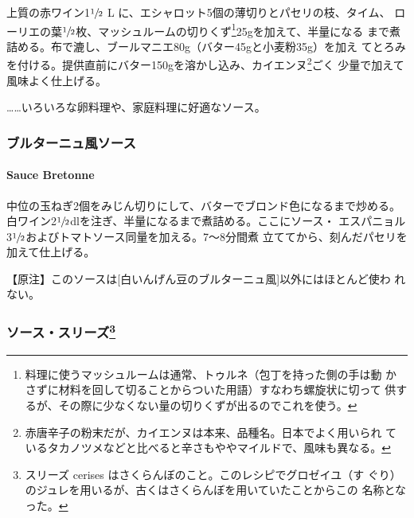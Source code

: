 
上質の赤ワイン1\(\sfrac{1}{2}\) L
に、エシャロット5個の薄切りとパセリの枝、タイム、
ローリエの葉\(\sfrac{1}{2}\)枚、マッシュルームの切りくず\footnote{料理に使うマッシュルームは通常、トゥルネ（包丁を持った側の手は動
  かさずに材料を回して切ることからついた用語）すなわち螺旋状に切って
  供するが、その際に少なくない量の切りくずが出るのでこれを使う。}25gを加えて、半量になる
まで煮詰める。布で漉し、ブールマニエ80g（バター45gと小麦粉35g）を加え
てとろみを付ける。提供直前にバター150gを溶かし込み、カイエンヌ\footnote{赤唐辛子の粉末だが、カイエンヌは本来、品種名。日本でよく用いられ
  ているタカノツメなどと比べると辛さもややマイルドで、風味も異なる。}ごく
少量で加えて風味よく仕上げる。

\ldots{}\ldots{}いろいろな卵料理や、家庭料理に好適なソース。

\maeaki

\hypertarget{ux30d6ux30ebux30bfux30fcux30cbux30e5ux98a8ux30bdux30fcux30b9}{%
\subsubsection{ブルターニュ風ソース}\label{ux30d6ux30ebux30bfux30fcux30cbux30e5ux98a8ux30bdux30fcux30b9}}

\hypertarget{sauce-bretonne}{%
\paragraph{Sauce Bretonne}\label{sauce-bretonne}}


中位の玉ねぎ2個をみじん切りにして、バターでブロンド色になるまで炒める。
白ワイン2\(\sfrac{1}{2}\)dlを注ぎ、半量になるまで煮詰める。ここにソース・
エスパニョル3\(\sfrac{1}{2}\)およびトマトソース同量を加える。7〜8分間煮
立ててから、刻んだパセリを加えて仕上げる。

【原注】このソースは{[}白いんげん豆のブルターニュ風{]}以外にはほとんど使わ
れない。

\maeaki

\hypertarget{ux30bdux30fcux30b9ux30b9ux30eaux30fcux30ba6}{%
\subsubsection[ソース・スリーズ]{\texorpdfstring{ソース・スリーズ\footnote{スリーズ
  cerises はさくらんぼのこと。このレシピでグロゼイユ（す
  ぐり）のジュレを用いるが、古くはさくらんぼを用いていたことからこの
  名称となった。}}{ソース・スリーズ}}\label{ux30bdux30fcux30b9ux30b9ux30eaux30fcux30ba6}}

